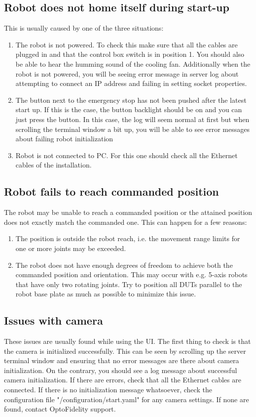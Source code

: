 \subsection{Robot does not home itself during start-up}
\label{subsec:robot_not_moving}
This is usually caused by one of the three situations:
\begin{enumerate}
	\item The robot is not powered. To check this make sure that all the cables are plugged in and that the control box switch is in position 1. You should also be able to hear the humming sound of the cooling fan. Additionally when the robot is not powered, you will be seeing error message in server log about attempting to connect an IP address and failing in setting socket properties.
	\item The button next to the emergency stop has not been pushed after the latest start up. If this is the case, the button backlight should be on and you can just press the button. In this case, the log will seem normal at first but when scrolling the terminal window a bit up, you will be able to see error messages about failing robot initialization
	\item Robot is not connected to PC. For this one should check all the Ethernet cables of the installation.
\end{enumerate}

\subsection{Robot fails to reach commanded position}
\label{subsec:robot_positioning_fails}
The robot may be unable to reach a commanded position or the attained position does not exactly match the commanded one. This can happen for a few reasons:
\begin{enumerate}
	\item The position is outside the robot reach, i.e. the movement range limits for one or more joints may be exceeded.
	\item The robot does not have enough degrees of freedom to achieve both the commanded position and orientation. This may occur with e.g. 5-axis robots that have only two rotating joints. Try to position all DUTs parallel to the robot base plate as much as possible to minimize this issue.
\end{enumerate}

\subsection{Issues with camera}
\label{subsec:camera_issues}
These issues are usually found while using the UI. The first thing to check is that the camera is initialized successfully. This can be seen by scrolling up the server terminal window and ensuring that no error messages are there about camera initialization. On the contrary, you should see a log message about successful camera initialization. If there are errors, check that all the Ethernet cables are connected. If there is no initialization message whatsoever, check the configuration file "\tntRootPath\tntServerFolder/configuration/start.yaml" for any camera settings. If none are found, contact OptoFidelity support.

